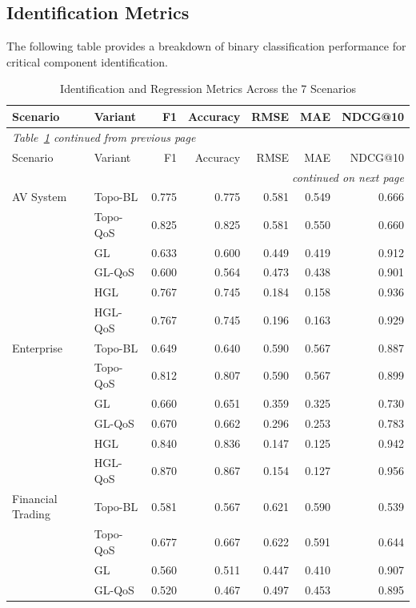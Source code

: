 \documentclass[review]{elsarticle}
\begin{document}
\subsection{Identification Metrics}

The following table provides a breakdown of binary classification performance for critical
component identification.

\begin{longtable}{@{}llrrrrr@{}}
\caption{Identification and Regression Metrics Across the 7 Scenarios}
\label{tab:identification} \\
\toprule
Scenario & Variant & F1 & Accuracy & RMSE & MAE & NDCG@10 \\
\midrule
\endfirsthead
\multicolumn{7}{l}{\textit{Table~\ref{tab:identification} continued from previous page}} \\
\toprule
Scenario & Variant & F1 & Accuracy & RMSE & MAE & NDCG@10 \\
\midrule
\endhead
\midrule
\multicolumn{7}{r}{\textit{continued on next page}} \\
\endfoot
\bottomrule
\endlastfoot
AV System & Topo-BL & 0.775 & 0.775 & 0.581 & 0.549 & 0.666 \\
 & Topo-QoS & 0.825 & 0.825 & 0.581 & 0.550 & 0.660 \\
 & GL & 0.633 & 0.600 & 0.449 & 0.419 & 0.912 \\
 & GL-QoS & 0.600 & 0.564 & 0.473 & 0.438 & 0.901 \\
 & HGL & 0.767 & 0.745 & 0.184 & 0.158 & 0.936 \\
 & HGL-QoS & 0.767 & 0.745 & 0.196 & 0.163 & 0.929 \\
\addlinespace
Enterprise & Topo-BL & 0.649 & 0.640 & 0.590 & 0.567 & 0.887 \\
 & Topo-QoS & 0.812 & 0.807 & 0.590 & 0.567 & 0.899 \\
 & GL & 0.660 & 0.651 & 0.359 & 0.325 & 0.730 \\
 & GL-QoS & 0.670 & 0.662 & 0.296 & 0.253 & 0.783 \\
 & HGL & 0.840 & 0.836 & 0.147 & 0.125 & 0.942 \\
 & HGL-QoS & 0.870 & 0.867 & 0.154 & 0.127 & 0.956 \\
\addlinespace
Financial Trading & Topo-BL & 0.581 & 0.567 & 0.621 & 0.590 & 0.539 \\
 & Topo-QoS & 0.677 & 0.667 & 0.622 & 0.591 & 0.644 \\
 & GL & 0.560 & 0.511 & 0.447 & 0.410 & 0.907 \\
 & GL-QoS & 0.520 & 0.467 & 0.497 & 0.453 & 0.895 \\

\end{longtable}
\end{document}

